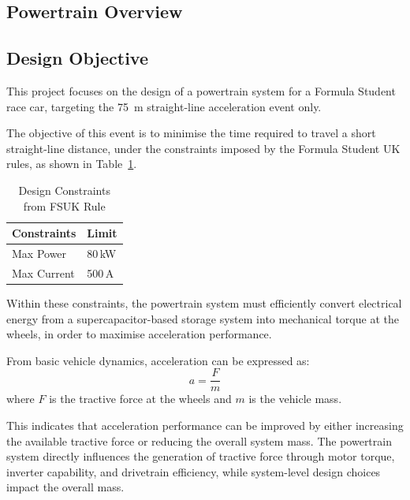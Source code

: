 \documentclass[11pt, a4paper]{report}
\numberwithin{equation}{section}
\begin{document}
\begin{refsection}
\graphicspath{{../YuzeJiang/Engineering/figures/}{../YuzeJiang/Engineering/}}

\section{Powertrain Overview}

\subsection{Design Objective}

This project focuses on the design of a powertrain system for a Formula Student race car, targeting the \SI{75}{\meter} straight-line acceleration event only.

The objective of this event is to minimise the time required to travel a short straight-line distance, under the constraints imposed by the Formula Student UK rules, as shown in Table~\ref{tab:FSUK_constraints}.

\begin{table}[H]
\centering
\small
\setlength{\tabcolsep}{24pt}

\caption{Design Constraints from FSUK Rule\cite{fs-ev-rules2026}}
\label{tab:FSUK_constraints}

\begin{tabularx}{0.4\textwidth}{l X}
\toprule
\textbf{Constraints} & \textbf{Limit} \\
\midrule
Max Power & 80\,kW \\
Max Current & 500\,A \\
\bottomrule
\end{tabularx}
\end{table}

Within these constraints, the powertrain system must efficiently convert electrical energy from a supercapacitor-based storage system into mechanical torque at the wheels, in order to maximise acceleration performance.

From basic vehicle dynamics, acceleration can be expressed as:
\begin{equation}
a = \frac{F}{m}
\end{equation}
where $F$ is the tractive force at the wheels and $m$ is the vehicle mass.

This indicates that acceleration performance can be improved by either increasing the available tractive force or reducing the overall system mass. The powertrain system directly influences the generation of tractive force through motor torque, inverter capability, and drivetrain efficiency, while system-level design choices impact the overall mass.


\end{refsection}
\end{document}
